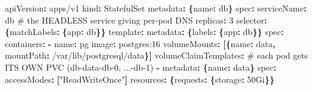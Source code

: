 \documentclass[11pt]{article}
\newenvironment{Shaded}{\begin{snugshade}}{\end{snugshade}}
\newcommand{\AttributeTok}[1]{\textcolor[rgb]{0.16,0.50,0.73}{#1}}
\newcommand{\CommentTok}[1]{\textcolor[rgb]{0.48,0.49,0.49}{#1}}
\newcommand{\DecValTok}[1]{\textcolor[rgb]{0.96,0.45,0.00}{#1}}
\newcommand{\FunctionTok}[1]{\textcolor[rgb]{0.56,0.27,0.68}{#1}}
\newcommand{\KeywordTok}[1]{\textcolor[rgb]{0.81,0.81,0.76}{\textbf{#1}}}
\newcommand{\StringTok}[1]{\textcolor[rgb]{0.96,0.31,0.31}{#1}}
\begin{document}

\begin{Shaded}
\begin{Highlighting}[]
\FunctionTok{apiVersion}\KeywordTok{:}\AttributeTok{ apps/v1}
\FunctionTok{kind}\KeywordTok{:}\AttributeTok{ StatefulSet}
\FunctionTok{metadata}\KeywordTok{:}\AttributeTok{ }\KeywordTok{\{}\FunctionTok{name}\KeywordTok{:}\AttributeTok{ db}\KeywordTok{\}}
\FunctionTok{spec}\KeywordTok{:}
\AttributeTok{  }\FunctionTok{serviceName}\KeywordTok{:}\AttributeTok{ db}\CommentTok{          \# the HEADLESS service giving per{-}pod DNS}
\AttributeTok{  }\FunctionTok{replicas}\KeywordTok{:}\AttributeTok{ }\DecValTok{3}
\AttributeTok{  }\FunctionTok{selector}\KeywordTok{:}\AttributeTok{ }\KeywordTok{\{}\FunctionTok{matchLabels}\KeywordTok{:}\AttributeTok{ }\KeywordTok{\{}\FunctionTok{app}\KeywordTok{:}\AttributeTok{ db}\KeywordTok{\}\}}
\AttributeTok{  }\FunctionTok{template}\KeywordTok{:}
\AttributeTok{    }\FunctionTok{metadata}\KeywordTok{:}\AttributeTok{ }\KeywordTok{\{}\FunctionTok{labels}\KeywordTok{:}\AttributeTok{ }\KeywordTok{\{}\FunctionTok{app}\KeywordTok{:}\AttributeTok{ db}\KeywordTok{\}\}}
\AttributeTok{    }\FunctionTok{spec}\KeywordTok{:}
\AttributeTok{      }\FunctionTok{containers}\KeywordTok{:}
\AttributeTok{        }\KeywordTok{{-}}\AttributeTok{ }\FunctionTok{name}\KeywordTok{:}\AttributeTok{ pg}
\AttributeTok{          }\FunctionTok{image}\KeywordTok{:}\AttributeTok{ postgres:16}
\AttributeTok{          }\FunctionTok{volumeMounts}\KeywordTok{:}\AttributeTok{ }\KeywordTok{[\{}\FunctionTok{name}\KeywordTok{:}\AttributeTok{ data}\KeywordTok{,}\AttributeTok{ }\FunctionTok{mountPath}\KeywordTok{:}\AttributeTok{ /var/lib/postgresql/data}\KeywordTok{\}]}
\AttributeTok{  }\FunctionTok{volumeClaimTemplates}\KeywordTok{:}\CommentTok{    \# each pod gets ITS OWN PVC (db{-}data{-}db{-}0, ...{-}db{-}1)}
\AttributeTok{    }\KeywordTok{{-}}\AttributeTok{ }\FunctionTok{metadata}\KeywordTok{:}\AttributeTok{ }\KeywordTok{\{}\FunctionTok{name}\KeywordTok{:}\AttributeTok{ data}\KeywordTok{\}}
\AttributeTok{      }\FunctionTok{spec}\KeywordTok{:}
\AttributeTok{        }\FunctionTok{accessModes}\KeywordTok{:}\AttributeTok{ }\KeywordTok{[}\StringTok{"ReadWriteOnce"}\KeywordTok{]}
\AttributeTok{        }\FunctionTok{resources}\KeywordTok{:}\AttributeTok{ }\KeywordTok{\{}\FunctionTok{requests}\KeywordTok{:}\AttributeTok{ }\KeywordTok{\{}\FunctionTok{storage}\KeywordTok{:}\AttributeTok{ 50Gi}\KeywordTok{\}\}}
\end{Highlighting}
\end{Shaded}
\end{document}
